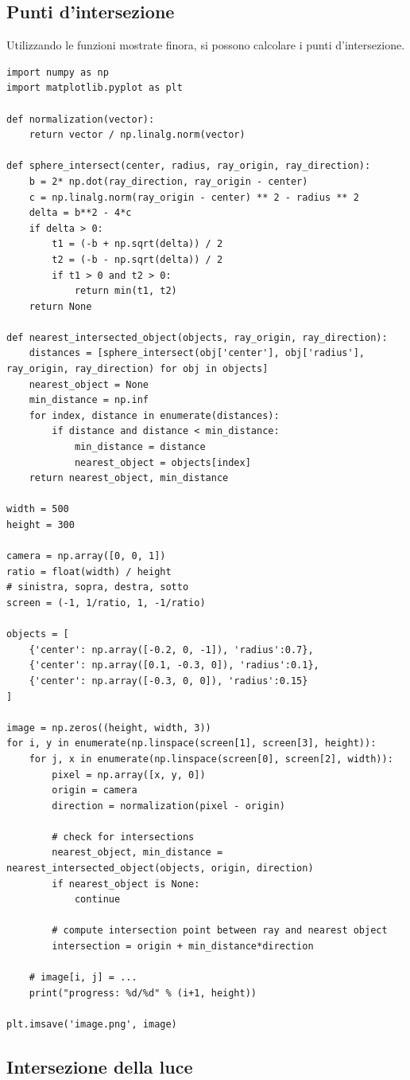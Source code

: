\documentclass[9pt,a4paper,twoside]{tau}
\begin{document}
\subsection{Punti d'intersezione}
Utilizzando le funzioni mostrate finora, si possono calcolare i punti d'intersezione.
\begin{lstlisting}
import numpy as np
import matplotlib.pyplot as plt

def normalization(vector):
    return vector / np.linalg.norm(vector)

def sphere_intersect(center, radius, ray_origin, ray_direction):
    b = 2* np.dot(ray_direction, ray_origin - center)
    c = np.linalg.norm(ray_origin - center) ** 2 - radius ** 2
    delta = b**2 - 4*c
    if delta > 0:
        t1 = (-b + np.sqrt(delta)) / 2
        t2 = (-b - np.sqrt(delta)) / 2
        if t1 > 0 and t2 > 0:
            return min(t1, t2)
    return None

def nearest_intersected_object(objects, ray_origin, ray_direction):
    distances = [sphere_intersect(obj['center'], obj['radius'], ray_origin, ray_direction) for obj in objects]
    nearest_object = None
    min_distance = np.inf
    for index, distance in enumerate(distances):
        if distance and distance < min_distance:
            min_distance = distance
            nearest_object = objects[index]
    return nearest_object, min_distance

width = 500
height = 300

camera = np.array([0, 0, 1])
ratio = float(width) / height
# sinistra, sopra, destra, sotto
screen = (-1, 1/ratio, 1, -1/ratio)  

objects = [
    {'center': np.array([-0.2, 0, -1]), 'radius':0.7},
    {'center': np.array([0.1, -0.3, 0]), 'radius':0.1},
    {'center': np.array([-0.3, 0, 0]), 'radius':0.15}
]

image = np.zeros((height, width, 3))
for i, y in enumerate(np.linspace(screen[1], screen[3], height)):
    for j, x in enumerate(np.linspace(screen[0], screen[2], width)):
        pixel = np.array([x, y, 0])
        origin = camera
        direction = normalization(pixel - origin)

        # check for intersections
        nearest_object, min_distance = nearest_intersected_object(objects, origin, direction)
        if nearest_object is None:
            continue

        # compute intersection point between ray and nearest object
        intersection = origin + min_distance*direction
        
    # image[i, j] = ...  
    print("progress: %d/%d" % (i+1, height))

plt.imsave('image.png', image)
\end{lstlisting}

\subsection{Intersezione della luce}
					

\nocite{*}
\printbibliography

\end{document}
